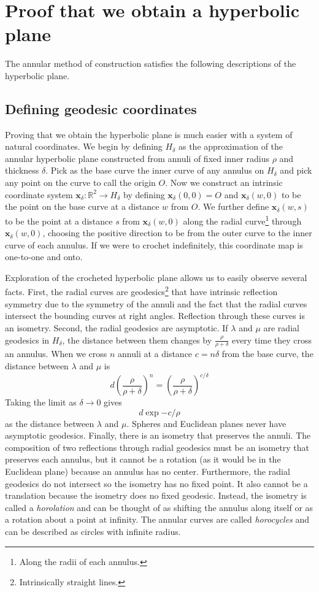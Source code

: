 \documentclass[letterpaper,titlepage]{article}
\begin{document}
\section{Proof that we obtain a hyperbolic plane}
The annular method of construction satisfies the following descriptions of the hyperbolic plane.
\subsection{Defining geodesic coordinates}
Proving that we obtain the hyperbolic plane is much easier with a system of natural coordinates.
We begin by defining $H_\delta$ as the approximation of the annular hyperbolic plane constructed from annuli of fixed inner radius $\rho$ and thickness $\delta$.
Pick as the base curve the inner curve of any annulus on $H_\delta$ and pick any point on the curve to call the origin $O$.
Now we construct an intrinsic coordinate system $\mathbf{x}_\delta : \mathbb{R}^2 \to H_\delta$ by defining $\mathbf{x}_\delta(0,0) = O$ and $\mathbf{x}_\delta(w,0)$ to be the point on the base curve at a distance $w$ from $O$.
We further define $\mathbf{x}_\delta(w,s)$ to be the point at a distance $s$ from $\mathbf{x}_\delta(w,0)$ along the radial curve\footnote{Along the radii of each annulus.} through $\mathbf{x}_\delta(w,0)$, choosing the positive direction to be from the outer curve to the inner curve of each annulus.
If we were to crochet indefinitely, this coordinate map is one-to-one and onto.

Exploration of the crocheted hyperbolic plane allows us to easily observe several facts.
First, the radial curves are geodesics\footnote{Intrinsically straight lines.} that have intrinsic reflection symmetry due to the symmetry of the annuli and the fact that the radial curves intersect the bounding curves at right angles.
Reflection through these curves is an isometry.
Second, the radial geodesics are asymptotic.
If $\lambda$ and $\mu$ are radial geodesics in $H_\delta$, the distance between them changes by $\frac{\rho}{\rho+\delta}$ every time they cross an annulus.
When we cross $n$ annuli at a distance $c = n\delta$ from the base curve, the distance between $\lambda$ and $\mu$ is
\[ d \left( \frac{\rho}{\rho+\delta} \right)^n =  \left( \frac{\rho}{\rho+\delta} \right)^{c/\delta} \]
Taking the limit as $\delta \to 0$ gives
\begin{equation}
d \exp{-c/\rho}
\label{distance}
\end{equation}
as the distance between $\lambda$ and $\mu$.
Spheres and Euclidean planes never have asymptotic geodesics.
Finally, there is an isometry that preserves the annuli.
The composition of two reflections through radial geodesics must be an isometry that preserves each annulus, but it cannot be a rotation (as it would be in the Euclidean plane) because an annulus has no center.
Furthermore, the radial geodesics do not intersect so the isometry has no fixed point.
It also cannot be a translation because the isometry does no fixed geodesic.
Instead, the isometry is called a \emph{horolation} and can be thought of as shifting the annulus along itself or as a rotation about a point at infinity.
The annular curves are called \emph{horocycles} and can be described as circles with infinite radius.\cite{crochetplane}
\end{document}
